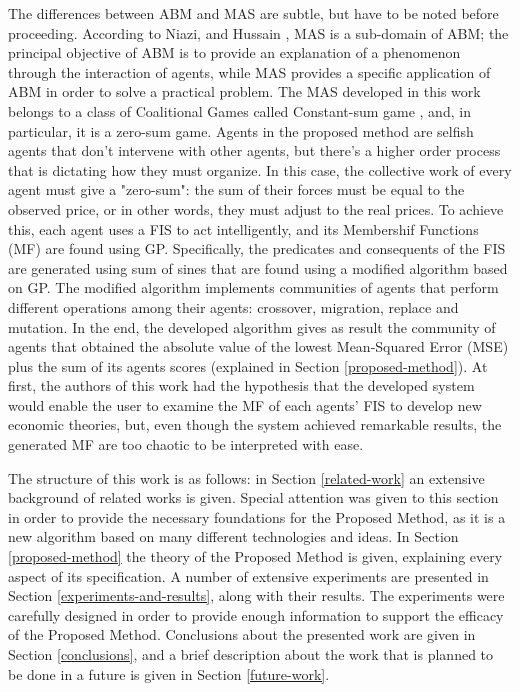 The differences between ABM and MAS are subtle, but have to be noted before proceeding. According to Niazi, and Hussain \cite{Niazi_2011}, MAS is a sub-domain of ABM; the principal objective of ABM is to provide an explanation of a phenomenon through the interaction of agents, while MAS provides a specific application of ABM in order to solve a practical problem. The MAS developed in this work belongs to a class of Coalitional Games called Constant-sum game \cite{Shoham2009}, and, in particular, it is a zero-sum game. Agents in the proposed method are selfish agents that don't intervene with other agents, but there's a higher order process that is dictating how they must organize. In this case, the collective work of every agent must give a "zero-sum": the sum of their forces must be equal to the observed price, or in other words, they must adjust to the real prices. To achieve this, each agent uses a FIS to act intelligently, and its Membershif Functions (MF) are found using GP. Specifically, the predicates and consequents of the FIS are generated using sum of sines that are found using a modified algorithm based on GP. The modified algorithm implements communities of agents that perform different operations among their agents: crossover, migration, replace and mutation. In the end, the developed algorithm gives as result the community of agents that obtained the absolute value of the lowest Mean-Squared Error (MSE) plus the sum of its agents scores (explained in Section \ref{proposed-method}). At first, the authors of this work had the hypothesis that the developed system would enable the user to examine the MF of each agents' FIS to develop new economic theories, but, even though the system achieved remarkable results, the generated MF are too chaotic to be interpreted with ease.

The structure of this work is as follows: in Section \ref{related-work} an extensive background of related works is given. Special attention was given to this section in order to provide the necessary foundations for the Proposed Method, as it is a new algorithm based on many different technologies and ideas. In Section \ref{proposed-method} the theory of the Proposed Method is given, explaining every aspect of its specification. A number of extensive experiments are presented in Section \ref{experiments-and-results}, along with their results. The experiments were carefully designed in order to provide enough information to support the efficacy of the Proposed Method. Conclusions about the presented work are given in Section \ref{conclusions}, and a brief description about the work that is planned to be done in a future is given in Section \ref{future-work}.
  